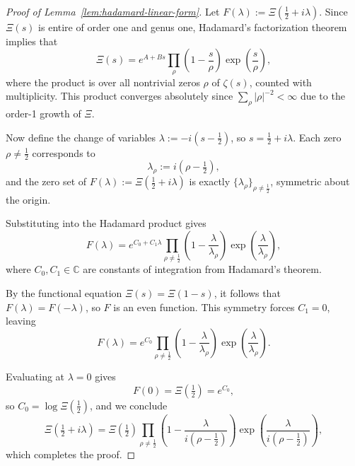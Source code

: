 \begin{proof}[Proof of Lemma~\ref{lem:hadamard-linear-form}]
Let \( F(\lambda) := \Xi\left( \tfrac{1}{2} + i\lambda \right) \). Since \( \Xi(s) \) is entire of order one and genus one, Hadamard’s factorization theorem \cite[Theorem~3.7.1]{Levin1996EntireLectures} implies that
\[
\Xi(s) = e^{A + B s} \prod_{\rho} \left( 1 - \frac{s}{\rho} \right) \exp\left( \frac{s}{\rho} \right),
\]
where the product is over all nontrivial zeros \( \rho \) of \( \zeta(s) \), counted with multiplicity. This product converges absolutely since \( \sum_\rho |\rho|^{-2} < \infty \) due to the order-1 growth of \( \Xi \).

\medskip
Now define the change of variables \( \lambda := -i(s - \tfrac{1}{2}) \), so \( s = \tfrac{1}{2} + i\lambda \). Each zero \( \rho \ne \tfrac{1}{2} \) corresponds to
\[
\lambda_\rho := i(\rho - \tfrac{1}{2}),
\]
and the zero set of \( F(\lambda) := \Xi(\tfrac{1}{2} + i\lambda) \) is exactly \( \{ \lambda_\rho \}_{\rho \ne \tfrac{1}{2}} \), symmetric about the origin.

Substituting into the Hadamard product gives
\[
F(\lambda) = e^{C_0 + C_1 \lambda} \prod_{\rho \ne \tfrac{1}{2}} \left( 1 - \frac{\lambda}{\lambda_\rho} \right) \exp\left( \frac{\lambda}{\lambda_\rho} \right),
\]
where \( C_0, C_1 \in \mathbb{C} \) are constants of integration from Hadamard's theorem.

\medskip
By the functional equation \( \Xi(s) = \Xi(1 - s) \), it follows that \( F(\lambda) = F(-\lambda) \), so \( F \) is an even function. This symmetry forces \( C_1 = 0 \), leaving
\[
F(\lambda) = e^{C_0} \prod_{\rho \ne \tfrac{1}{2}} \left( 1 - \frac{\lambda}{\lambda_\rho} \right) \exp\left( \frac{\lambda}{\lambda_\rho} \right).
\]

Evaluating at \( \lambda = 0 \) gives
\[
F(0) = \Xi\left( \tfrac{1}{2} \right) = e^{C_0},
\]
so \( C_0 = \log \Xi(\tfrac{1}{2}) \), and we conclude
\[
\Xi\left( \tfrac{1}{2} + i\lambda \right)
= \Xi\left( \tfrac{1}{2} \right) \prod_{\rho \ne \tfrac{1}{2}} \left( 1 - \frac{\lambda}{i(\rho - \tfrac{1}{2})} \right) \exp\left( \frac{\lambda}{i(\rho - \tfrac{1}{2})} \right),
\]
which completes the proof.
\end{proof}
%  